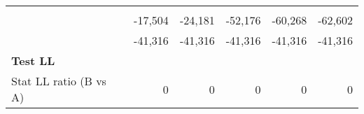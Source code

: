 \begin{tabular}{llllll}
  \multicolumn{1}{|r}{} &
  \multicolumn{1}{r}{} &
  \multicolumn{1}{r}{} &
  \multicolumn{1}{r}{} &
  \multicolumn{1}{r}{} \\
\multicolumn{1}{l}{\hspace{1em}{Model (A)}} &
  \multicolumn{1}{|r}{-17,504} &
  \multicolumn{1}{r}{-24,181} &
  \multicolumn{1}{r}{-52,176} &
  \multicolumn{1}{r}{-60,268} &
  \multicolumn{1}{r}{-62,602} \\
\multicolumn{1}{l}{\hspace{1em}{Model (B)}} &
  \multicolumn{1}{|r}{-41,316} &
  \multicolumn{1}{r}{-41,316} &
  \multicolumn{1}{r}{-41,316} &
  \multicolumn{1}{r}{-41,316} &
  \multicolumn{1}{r}{-41,316} \\
\multicolumn{1}{l}{\textbf{Test LL}} &
  \multicolumn{1}{|r}{} &
  \multicolumn{1}{r}{} &
  \multicolumn{1}{r}{} &
  \multicolumn{1}{r}{} &
  \multicolumn{1}{r}{} \\
\multicolumn{1}{l}{\hspace{1em}Stat LL ratio (B vs A)} &
  \multicolumn{1}{|r}{0} &
  \multicolumn{1}{r}{0} &
  \multicolumn{1}{r}{0} &
  \multicolumn{1}{r}{0} &
  \multicolumn{1}{r}{0} \\
\cline{1-6}
\end{tabular}
